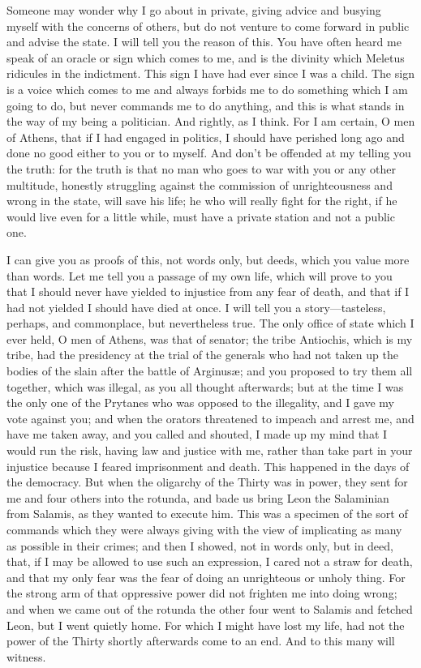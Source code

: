 \documentclass[12pt]{article}
\begin{document}
Someone may wonder why I go about in private, giving advice and busying
myself with the concerns of others, but do not venture to come forward
in public and advise the state. I will tell you the reason of this.
You have often heard me speak of an oracle or sign which comes to
me, and is the divinity which Meletus ridicules in the indictment.
This sign I have had ever since I was a child. The sign is a voice
which comes to me and always forbids me to do something which I am
going to do, but never commands me to do anything, and this is what
stands in the way of my being a politician. And rightly, as I think.
For I am certain, O men of Athens, that if I had engaged in politics,
I should have perished long ago and done no good either to you or
to myself. And don't be offended at my telling you the truth: for
the truth is that no man who goes to war with you or any other multitude,
honestly struggling against the commission of unrighteousness and
wrong in the state, will save his life; he who will really fight for
the right, if he would live even for a little while, must have a private
station and not a public one.

I can give you as proofs of this, not words only, but deeds, which
you value more than words. Let me tell you a passage of my own life,
which will prove to you that I should never have yielded to injustice
from any fear of death, and that if I had not yielded I should have
died at once. I will tell you a story---tasteless, perhaps, and commonplace,
but nevertheless true. The only office of state which I ever held,
O men of Athens, was that of senator; the tribe Antiochis, which is
my tribe, had the presidency at the trial of the generals who had
not taken up the bodies of the slain after the battle of Arginus{\ae};
and you proposed to try them all together, which was illegal, as you
all thought afterwards; but at the time I was the only one of the
Prytanes who was opposed to the illegality, and I gave my vote against
you; and when the orators threatened to impeach and arrest me, and
have me taken away, and you called and shouted, I made up my mind
that I would run the risk, having law and justice with me, rather
than take part in your injustice because I feared imprisonment and
death. This happened in the days of the democracy. But when the oligarchy
of the Thirty was in power, they sent for me and four others into
the rotunda, and bade us bring Leon the Salaminian from Salamis, as
they wanted to execute him. This was a specimen of the sort of commands
which they were always giving with the view of implicating as many
as possible in their crimes; and then I showed, not in words only,
but in deed, that, if I may be allowed to use such an expression,
I cared not a straw for death, and that my only fear was the fear
of doing an unrighteous or unholy thing. For the strong arm of that
oppressive power did not frighten me into doing wrong; and when we
came out of the rotunda the other four went to Salamis and fetched
Leon, but I went quietly home. For which I might have lost my life,
had not the power of the Thirty shortly afterwards come to an end.
And to this many will witness.
\end{document}
